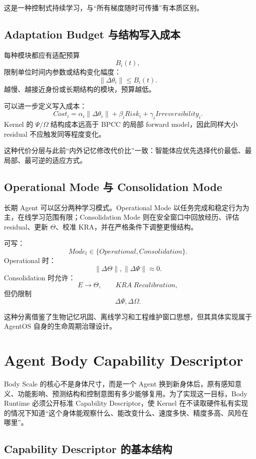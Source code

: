 这是一种控制式持续学习，与“所有梯度随时可传播”有本质区别。

\section{Adaptation Budget 与结构写入成本}

每种模块都应有适配预算
\[
B_i(t),
\]
限制单位时间内参数或结构变化幅度：
\[
\|\Delta \theta_i\|
\le
B_i(t).
\]
越慢、越接近身份或长期结构的模块，预算越低。

可以进一步定义写入成本：
\[
Cost_i
=
\alpha_i
\|\Delta\theta_i\|
+
\beta_i
Risk_i
+
\gamma_i
Irreversibility_i.
\]
Kernel 的 $\Psi/\Omega$ 结构成本远高于 BPCC 的局部 forward model，因此同样大小 residual 不应触发同等程度变化。

这种代价分层与此前“内外记忆修改代价比”一致：智能体应优先选择代价最低、最局部、最可逆的适应方式。

\section{Operational Mode 与 Consolidation Mode}

长期 Agent 可以区分两种学习模式。Operational Mode 以任务完成和稳定行为为主，在线学习范围有限；Consolidation Mode 则在安全窗口中回放经历、评估 residual、更新 $\Theta$、校准 KRA，并在严格条件下调整更慢结构。

可写：
\[
Mode_t
\in
\{
Operational,
Consolidation
\}.
\]
Operational 时：
\[
\|\Delta\Theta\|,\|\Delta\Psi\|\approx0.
\]
Consolidation 时允许：
\[
E\rightarrow\Theta,
\qquad
KRA\;Recalibration,
\]
但仍限制
\[
\Delta\Psi,\Delta\Omega.
\]

这种分离借鉴了生物记忆巩固、离线学习和工程维护窗口思想，但其具体实现属于 AgentOS 自身的生命周期治理设计。


\chapter{Agent Body Capability Descriptor}
\label{app:bodycap}

\begin{chapterlead}
Body Scale 的核心不是身体尺寸，而是一个 Agent 换到新身体后，原有感知意义、功能影响、预测结构和控制意图有多少能够复用。为了实现这一目标，Body Runtime 必须公开标准 Capability Descriptor，使 Kernel 在不读取硬件私有实现的情况下知道“这个身体能观察什么、能改变什么、速度多快、精度多高、风险在哪里”。
\end{chapterlead}

\section{Capability Descriptor 的基本结构}


